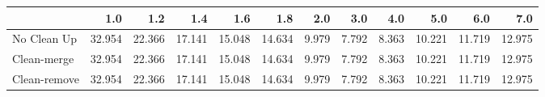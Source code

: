 \begin{tabular}{lrrrrrrrrrrr}
\toprule
{} &    1.0 &    1.2 &    1.4 &    1.6 &    1.8 &   2.0 &   3.0 &   4.0 &    5.0 &    6.0 &    7.0 \\
\midrule
No Clean Up  & 32.954 & 22.366 & 17.141 & 15.048 & 14.634 & 9.979 & 7.792 & 8.363 & 10.221 & 11.719 & 12.975 \\
Clean-merge  & 32.954 & 22.366 & 17.141 & 15.048 & 14.634 & 9.979 & 7.792 & 8.363 & 10.221 & 11.719 & 12.975 \\
Clean-remove & 32.954 & 22.366 & 17.141 & 15.048 & 14.634 & 9.979 & 7.792 & 8.363 & 10.221 & 11.719 & 12.975 \\
\bottomrule
\end{tabular}
